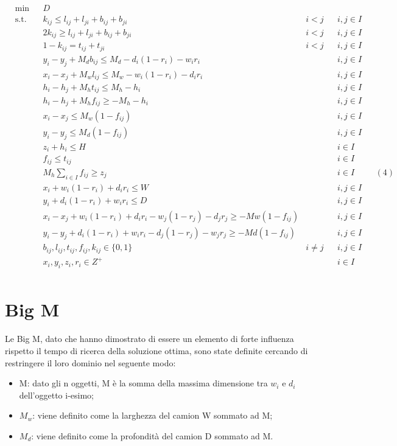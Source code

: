 \begin{equation*}
	\begin{aligned}
		& \underset{}{\text{min}}
		& & D \\
		& \text{s.t.} & & k_{ij} \leq l_{ij} + l_{ji} + b_{ij} + b_{ji} & i < j && i,j \in I \\
		& & & 2 k_{ij} \geq l_{ij} + l_{ji} + b_{ij} + b_{ji} & i < j && i,j \in I \\
		& & & 1 - k_{ij} = t_{ij} + t_{ji} & i < j && i,j \in I \\
		& & & y_i - y_j + M_d b_{ij} \leq M_d - d_i (1 - r_i) - w_i r_i & & & i,j \in I \\
		& & & x_i - x_j + M_w l_{ij} \leq M_w - w_i (1 - r_i) - d_i r_i & & & i,j \in I \\
		& & & h_i - h_j + M_h t_{ij} \leq M_h - h_i & & & i,j \in I \\
		& & & h_i - h_j + M_h f_{ij} \geq - M_h - h_i & & & i,j \in I \\
		& & & x_i - x_j \leq M_w (1-f_{ij}) & & & i,j \in I \\
		& & & y_i - y_j \leq M_d (1-f_{ij}) & & & i,j \in I \\
		& & & z_i + h_i \leq H & & & i \in I \\
		& & & f_{ij} \leq t_{ij} & & & i \in I \\
		  &   &   & M_h \sum_{i \in I} f_{ij} \geq z_j &   &   & i \in I &   & (4) \\
		& & & x_i + w_i (1 - r_i) + d_i r_i \leq W & & & i,j \in I \\
		& & & y_i + d_i (1 - r_i) + w_i r_i \leq D & & & i,j \in I \\
		& & & x_i - x_j + w_i(1-r_i) + d_i r_i - w_j(1-r_j) - d_j r_j \geq - Mw(1 - f_{ij}) & & & i,j \in I\\
		& & & y_i - y_j + d_i(1-r_i) + w_i r_i - d_j(1-r_j) - w_j r_j \geq - Md(1 - f_{ij}) & & & i,j \in I\\
		& & & b_{ij}, l_{ij}, t_{ij}, f_{ij}, k_{ij} \in \{0,1\} & i \neq j & & i,j \in I \\
		& & & x_{i}, y_{i}, z_{i}, r_{i} \in Z^{+} & & & i \in I \\
	\end{aligned}
\end{equation*}

\section{Big M}
Le Big M, dato che hanno dimostrato di essere un elemento di forte influenza rispetto il tempo di ricerca della soluzione ottima, sono state definite cercando di restringere il loro dominio nel seguente modo:
\begin{itemize}
	\item M: dato gli n oggetti, M è la somma della massima dimensione tra $w_i$ e $d_i$ dell'oggetto i-esimo;
	\item $M_w$: viene definito come la larghezza del camion W sommato ad M;
	\item $M_d$: viene definito come la profondità del camion D sommato ad M.
\end{itemize}
